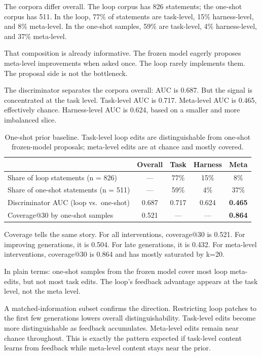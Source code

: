 \documentclass[11pt]{article}
\begin{document}
The corpora differ overall. The loop corpus has 826 statements; the one-shot corpus has 511. In the loop, 77\% of statements are task-level, 15\% harness-level, and 8\% meta-level. In the one-shot samples, 59\% are task-level, 4\% harness-level, and 37\% meta-level.

That composition is already informative. The frozen model eagerly proposes meta-level improvements when asked once. The loop rarely implements them. The proposal side is not the bottleneck.

The discriminator separates the corpora overall: AUC is 0.687. But the signal is concentrated at the task level. Task-level AUC is 0.717. Meta-level AUC is 0.465, effectively chance. Harness-level AUC is 0.624, based on a smaller and more imbalanced slice.

\begin{table}[h]
\centering
\small
\begin{tabular}{lcccc}
\toprule
 & Overall & Task & Harness & Meta \\
\midrule
Share of loop statements (n = 826)     & --- & 77\% & 15\% & 8\% \\
Share of one-shot statements (n = 511) & --- & 59\% & 4\%  & 37\% \\
Discriminator AUC (loop vs.\ one-shot) & 0.687 & 0.717 & 0.624 & \textbf{0.465} \\
Coverage@30 by one-shot samples        & 0.521 & --- & --- & \textbf{0.864} \\
\bottomrule
\end{tabular}
\caption{One-shot prior baseline. Task-level loop edits are distinguishable from one-shot frozen-model proposals; meta-level edits are at chance and mostly covered.}
\label{tab:oneshot}
\end{table}


Coverage tells the same story. For all interventions, coverage@30 is 0.521. For improving generations, it is 0.504. For late generations, it is 0.432. For meta-level interventions, coverage@30 is 0.864 and has mostly saturated by k=20.

In plain terms: one-shot samples from the frozen model cover most loop meta-edits, but not most task edits. The loop's feedback advantage appears at the task level, not the meta level.

A matched-information subset confirms the direction. Restricting loop patches to the first few generations lowers overall distinguishability. Task-level edits become more distinguishable as feedback accumulates. Meta-level edits remain near chance throughout. This is exactly the pattern expected if task-level content learns from feedback while meta-level content stays near the prior.
\end{document}
